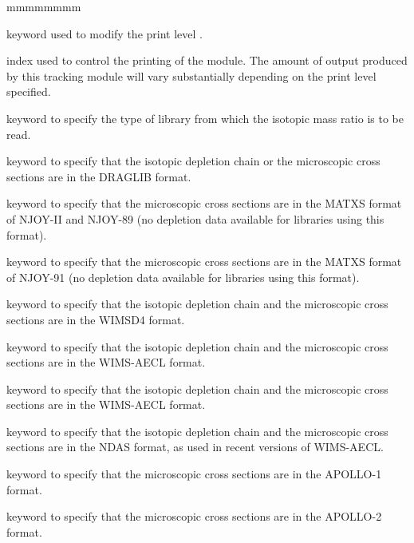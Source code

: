 \begin{ListeDeDescription}{mmmmmmmm}

\item[\moc{EDIT}] keyword used to modify the print level .

\item[\dusa{iprint}] index used to control the printing of the module. The
amount of output produced by this tracking module will vary substantially
depending on the print level specified.

\item[\moc{LIB:}] keyword to specify the type of library from which the
isotopic mass ratio is to be read. 

\item[\moc{DRAGON}] keyword to specify that the isotopic depletion chain or
the microscopic cross sections are in the DRAGLIB format.

\item[\moc{MATXS}] keyword to specify that the microscopic cross sections are
in the MATXS format of NJOY-II and NJOY-89 (no depletion data available for
libraries using this format).

\item[\moc{MATXS2}] keyword to specify that the microscopic cross sections are
in the MATXS format of NJOY-91  (no depletion data available for libraries using
this format).

\item[\moc{WIMSD4}] keyword to specify that the isotopic depletion chain and the
microscopic cross sections are in the WIMSD4 format.

\item[\moc{WIMS}] keyword to specify that the isotopic depletion chain and the
microscopic cross sections are in the WIMS-AECL format.

\item[\moc{WIMSAECL}] keyword to specify that the isotopic depletion chain and the
microscopic cross sections are in the WIMS-AECL format.

\item[\moc{NDAS}] keyword to specify that the isotopic depletion chain and the
microscopic cross sections are in the NDAS format, as used in recent versions of WIMS-AECL.

\item[\moc{APLIB1}] keyword to specify that the microscopic cross sections are
in the APOLLO-1 format.

\item[\moc{APLIB2}] keyword to specify that the microscopic cross sections are
in the APOLLO-2 format.


\end{ListeDeDescription}
